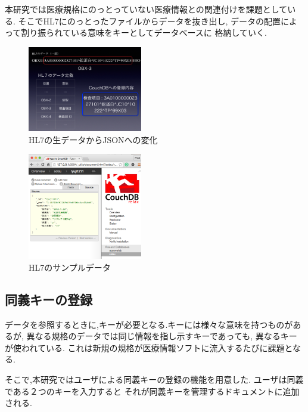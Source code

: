 			本研究では医療規格にのっとっていない医療情報との関連付けを課題としている.
			そこでHL7にのっとったファイルからデータを抜き出し,
			データの配置によって割り振られている意味をキーとしてデータベースに
			格納していく.

			\begin{figure}[htbp]
					\includegraphics[width=5cm, bb=0 0 437 688]{./gazou/hl7-data-trans2.png}
				\caption{HL7の生データからJSONへの変化}
				\label{hl7-data-trans}
			\end{figure}

			\begin{figure}[htbp]
					\includegraphics[width=5cm, bb=0 0 437 688]{./gazou/hl7-data.png}
				\caption{HL7のサンプルデータ}
				\label{hl7-data}
			\end{figure}



\subsection{同義キーの登録}
	データを参照するときに,キーが必要となる.キーには様々な意味を持つものがあるが,
	異なる規格のデータでは同じ情報を指し示すキーであっても,
	異なるキーが使われている.
	これは新規の規格が医療情報ソフトに流入するたびに課題となる.

	そこで,本研究ではユーザによる同義キーの登録の機能を用意した.
	ユーザは同義である２つのキーを入力すると
	それが同義キーを管理するドキュメントに追加される.

